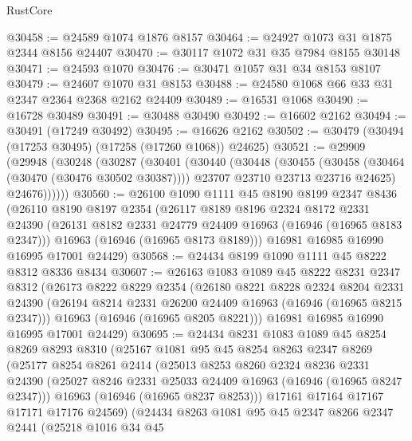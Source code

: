 \begin{lexlean}{RustCore}
\begin{coremodule}
@30458 := @24589 @1074 @1876 @8157
@30464 := @24927 @1073 @31 @1875 @2344 @8156 @24407
@30470 := @30117 @1072 @31 @35 @7984 @8155 @30148
@30471 := @24593 @1070
@30476 := @30471 @1057 @31 @34 @8153 @8107
@30479 := @24607 @1070 @31 @8153
@30488 := @24580 @1068 @66 @33 @31 @2347 @2364 @2368 @2162 @24409
@30489 := @16531 @1068
@30490 := @16728 @30489
@30491 := @30488 @30490
@30492 := @16602 @2162
@30494 := @30491 (@17249 @30492)
@30495 := @16626 @2162
@30502 := @30479 (@30494 (@17253 @30495) (@17258 (@17260 @1068)) @24625)
@30521 := @29909
    (@29948
      (@30248
        (@30287
          (@30401
            (@30440
              (@30448
                (@30455
                  (@30458 (@30464 (@30470 (@30476 @30502 @30387))))
                  @23707
                  @23710
                  @23713
                  @23716
                  @24625)
                @24676))))))
@30560 := @26100
    @1090
    @1111
    @45
    @8190
    @8199
    @2347
    @8436
    (@26110
      @8190
      @8197
      @2354
      (@26117
        @8189
        @8196
        @2324
        @8172
        @2331
        @24390
        (@26131 @8182 @2331 @24779 @24409 @16963 (@16946 (@16965 @8183 @2347)))
        @16963
        (@16946 (@16965 @8173 @8189)))
      @16981
      @16985
      @16990
      @16995
      @17001
      @24429)
@30568 := @24434 @8199 @1090 @1111 @45 @8222 @8312 @8336 @8434
@30607 := @26163
    @1083
    @1089
    @45
    @8222
    @8231
    @2347
    @8312
    (@26173
      @8222
      @8229
      @2354
      (@26180
        @8221
        @8228
        @2324
        @8204
        @2331
        @24390
        (@26194 @8214 @2331 @26200 @24409 @16963 (@16946 (@16965 @8215 @2347)))
        @16963
        (@16946 (@16965 @8205 @8221)))
      @16981
      @16985
      @16990
      @16995
      @17001
      @24429)
@30695 := @24434
    @8231
    @1083
    @1089
    @45
    @8254
    @8269
    @8293
    @8310
    (@25167
      @1081
      @95
      @45
      @8254
      @8263
      @2347
      @8269
      (@25177
        @8254
        @8261
        @2414
        (@25013
          @8253
          @8260
          @2324
          @8236
          @2331
          @24390
          (@25027 @8246 @2331 @25033 @24409 @16963 (@16946 (@16965 @8247 @2347)))
          @16963
          (@16946 (@16965 @8237 @8253)))
        @17161
        @17164
        @17167
        @17171
        @17176
        @24569)
      (@24434
        @8263
        @1081
        @95
        @45
        @2347
        @8266
        @2347
        @2441
        (@25218
          @1016
          @34
          @45

\end{coremodule}
\end{lexlean}

